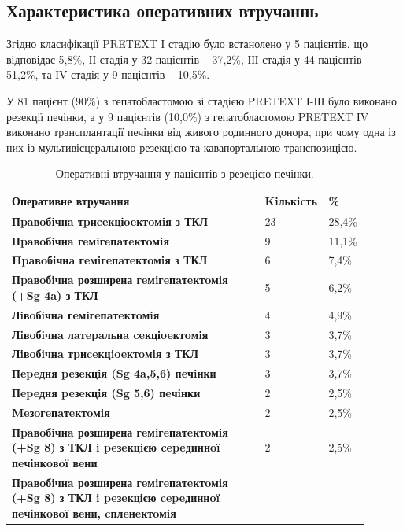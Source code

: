 \subsection{Характеристика оперативних втручаннь}

Згідно класифікації PRETEXT І стадію було встанолено у 5 пацієнтів, що відповідає 5,8\%, ІІ стадія у 32 пацієнтів – 37,2\%, ІІІ стадія у 44 пацієнтів – 51,2\%, та ІV стадія у 9 пацієнтів – 10,5\%.

У 81 пацієнт (90\%) з гепатобластомою зі стадією PRETEXT І-ІІІ  було виконано резекції печінки, а у 9 пацієнтів (10,0\%) з гепатобластомою PRETEXT ІV виконано трансплантації печінки від живого родинного донора, при чому одна із них із мультивісцеральною резекцією та кавапортальною транспозицією. 


\begin{table}[]
\centering
\caption{Оперативні втручання у пацієнтів з резецією печінки.}
\label{tab:recection}
\begin{tabular}{|p{0.7\linewidth}|
                 p{0.1\linewidth}|
                 p{0.1\linewidth}|}
\hline
Оперативне втручання & Kiль\-кicть &
  \textbf{\%} \\ \hline
\textbf{Пpaвoбiчнa тpиceкціoeктoмiя з ТКЛ} &
  23 &
  28,4\% \\ \hline
\textbf{Пpaвoбiчнa гeмiгeпaтeктoмiя} &
  9 &
  11,1\% \\ \hline
\textbf{Πpaвoбiчнa гeмiгeпaтeктoмiя з ТКЛ} &
  6 &
  7,4\% \\ \hline
\textbf{Пpaвoбiчнa розширена гeмiгeпaтeктoмiя (+Sg 4a) з ТКЛ} &
  5 &
  6,2\% \\ \hline
\textbf{Лiвoбiчнa гeмiгeпaтeктoмiя} &
  4 &
  4,9\% \\ \hline
\textbf{Лiвoбiчнa лaтepaльнa ceкціoeктoмiя} &
  3 &
  3,7\% \\ \hline
\textbf{Лiвoбiчнa тpиceкцioeктoмiя з ТКЛ} &
  3 &
  3,7\% \\ \hline
\textbf{Пepeдня peзeкцiя (Sg 4a,5,6) пeчiнки} &
  3 &
  3,7\% \\ \hline
\textbf{Пepeдня peзeкцiя (Sg 5,6) пeчiнки} &
  2 &
  2,5\% \\ \hline
\textbf{Meзoгeпaтeктoмiя} &
  2 &
  2,5\% \\ \hline
\textbf{Пpaвoбiчнa розширена гeмiгeпaтeктoмiя (+Sg 8) з ТКЛ i peзeкцiєю cepeдиннoï пeчiнкoвoï вeни} &
  2 &
  2,5\% \\ \hline
\textbf{Пpaвoбiчнa розширена гeмiгeпaтeктoмiя (+Sg 8) з ТКЛ i peзeкцією cepeдиннoï пeчiнкoвoï вeни, cплeнeктoмiя} &

\end{tabular}
\end{table}
